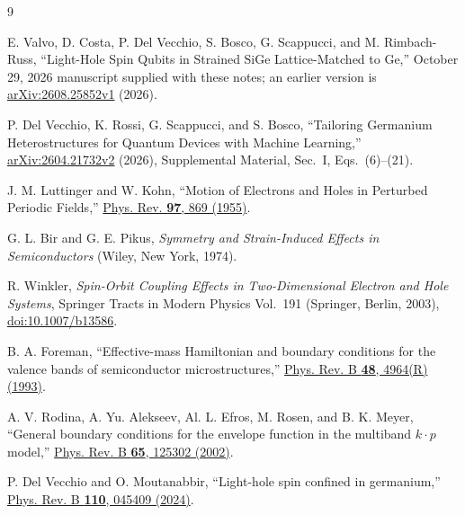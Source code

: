 \clearpage
\begin{thebibliography}{9}
{}

E. Valvo, D. Costa, P. Del Vecchio, S. Bosco, G. Scappucci, and M. Rimbach-Russ,
``Light-Hole Spin Qubits in Strained SiGe Lattice-Matched to Ge,''
October 29, 2026 manuscript supplied with these notes; an earlier version is
\href{https://arxiv.org/abs/2608.25852v1}{arXiv:2608.25852v1} (2026).

P. Del Vecchio, K. Rossi, G. Scappucci, and S. Bosco,
``Tailoring Germanium Heterostructures for Quantum Devices with Machine Learning,''
\href{https://arxiv.org/abs/2604.21732v2}{arXiv:2604.21732v2} (2026),
Supplemental Material, Sec.~I, Eqs.~(6)--(21).

J. M. Luttinger and W. Kohn,
``Motion of Electrons and Holes in Perturbed Periodic Fields,''
\href{https://doi.org/10.1103/PhysRev.97.869}{Phys. Rev. \textbf{97}, 869 (1955)}.

G. L. Bir and G. E. Pikus,
\emph{Symmetry and Strain-Induced Effects in Semiconductors}
(Wiley, New York, 1974).

R. Winkler,
\emph{Spin-Orbit Coupling Effects in Two-Dimensional Electron and Hole Systems},
Springer Tracts in Modern Physics Vol.~191
(Springer, Berlin, 2003),
\href{https://doi.org/10.1007/b13586}{doi:10.1007/b13586}.

B. A. Foreman,
``Effective-mass Hamiltonian and boundary conditions for the valence bands of semiconductor microstructures,''
\href{https://doi.org/10.1103/PhysRevB.48.4964}{Phys. Rev. B \textbf{48}, 4964(R) (1993)}.

A. V. Rodina, A. Yu. Alekseev, Al. L. Efros, M. Rosen, and B. K. Meyer,
``General boundary conditions for the envelope function in the multiband $k\cdot p$ model,''
\href{https://doi.org/10.1103/PhysRevB.65.125302}{Phys. Rev. B \textbf{65}, 125302 (2002)}.

P. Del Vecchio and O. Moutanabbir,
``Light-hole spin confined in germanium,''
\href{https://doi.org/10.1103/PhysRevB.110.045409}{Phys. Rev. B \textbf{110}, 045409 (2024)}.

\end{thebibliography}

